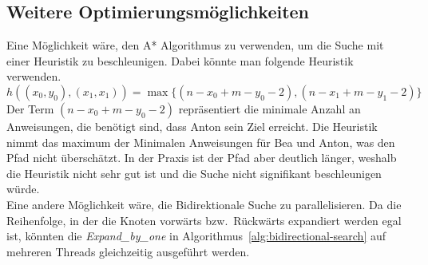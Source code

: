 \documentclass[a4paper,10pt,ngerman]{scrartcl}
\begin{document}
    \subsection{Weitere Optimierungsmöglichkeiten}
    Eine Möglichkeit wäre, den A* Algorithmus zu verwenden, um die Suche mit einer Heuristik zu beschleunigen.
    Dabei könnte man folgende Heuristik verwenden.
    \[h((x_0, y_0), (x_1, x_1)) = \max\{(n - x_0 + m - y_0 - 2), (n - x_1 + m - y_1 - 2)\}\]
    Der Term $(n - x_0 + m - y_0 - 2)$ repräsentiert die minimale Anzahl an Anweisungen, die benötigt sind, dass Anton sein Ziel erreicht.
    Die Heuristik nimmt das maximum der Minimalen Anweisungen für Bea und Anton, was den Pfad nicht überschätzt.
    In der Praxis ist der Pfad aber deutlich länger, weshalb die Heuristik nicht sehr gut ist und die Suche nicht signifikant beschleunigen würde.\\

    Eine andere Möglichkeit wäre, die Bidirektionale Suche zu parallelisieren.
    Da die Reihenfolge, in der die Knoten vorwärts bzw.\ Rückwärts expandiert werden egal ist, könnten die \textit{Expand\_by\_one} in Algorithmus~\ref{alg:bidirectional-search} auf mehreren Threads gleichzeitig ausgeführt werden.
\end{document}
